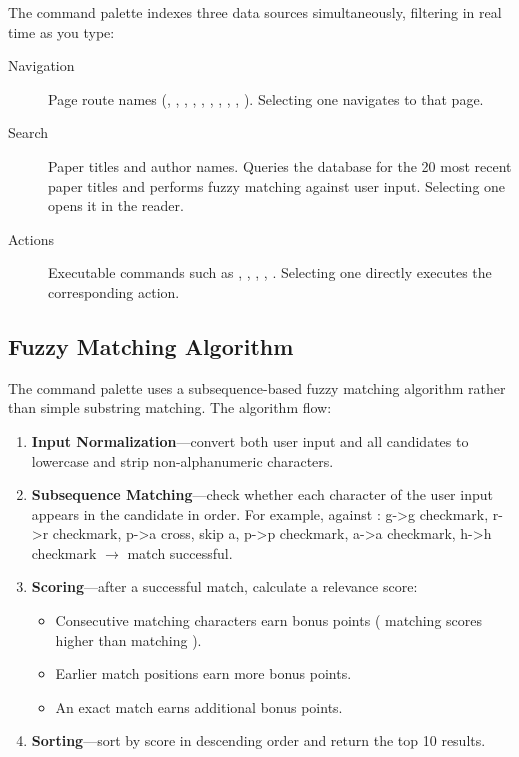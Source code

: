 The command palette indexes three data sources simultaneously, filtering in real time
as you type:

\begin{description}
  \item[Navigation] Page route names (, , ,
    , , , , ,
    , ). Selecting one navigates to that page.
  \item[Search] Paper titles and author names. Queries the database for the 20 most
    recent paper titles and performs fuzzy matching against user input. Selecting one
    opens it in the reader.
  \item[Actions] Executable commands such as , ,
    , , .
    Selecting one directly executes the corresponding action.
\end{description}

\subsection{Fuzzy Matching Algorithm}

The command palette uses a subsequence-based fuzzy matching algorithm rather than simple
substring matching. The algorithm flow:

\begin{enumerate}
  \item \textbf{Input Normalization}---convert both user input and all candidates to
    lowercase and strip non-alphanumeric characters.
  \item \textbf{Subsequence Matching}---check whether each character of the user input
    appears in the candidate in order. For example,  against :
    g->g checkmark, r->r checkmark, p->a cross, skip a, p->p checkmark,
    a->a checkmark, h->h checkmark $\rightarrow$ match successful.
  \item \textbf{Scoring}---after a successful match, calculate a relevance score:
    \begin{itemize}
      \item Consecutive matching characters earn bonus points ( matching
         scores higher than matching ).
      \item Earlier match positions earn more bonus points.
      \item An exact match earns additional bonus points.
    \end{itemize}
  \item \textbf{Sorting}---sort by score in descending order and return the top 10 results.
\end{enumerate}

